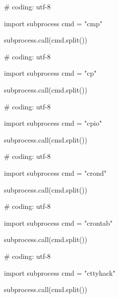 \begin{mylisting}[label={lst:acpid},language=sh,caption=cmp]

# coding: utf-8

import subprocess
cmd = "cmp"

subprocess.call(cmd.split())

\end{mylisting}

\begin{mylisting}[label={lst:acpid},language=sh,caption=cp]

# coding: utf-8

import subprocess
cmd = "cp"

subprocess.call(cmd.split())

\end{mylisting}

\begin{mylisting}[label={lst:acpid},language=sh,caption=cpio]

# coding: utf-8

import subprocess
cmd = "cpio"

subprocess.call(cmd.split())

\end{mylisting}

\begin{mylisting}[label={lst:acpid},language=sh,caption=crond]

# coding: utf-8

import subprocess
cmd = "crond"

subprocess.call(cmd.split())

\end{mylisting}

\begin{mylisting}[label={lst:acpid},language=sh,caption=crontab]

# coding: utf-8

import subprocess
cmd = "crontab"

subprocess.call(cmd.split())

\end{mylisting}

\begin{mylisting}[label={lst:acpid},language=sh,caption=cttyhack]

# coding: utf-8

import subprocess
cmd = "cttyhack"

subprocess.call(cmd.split())

\end{mylisting}

